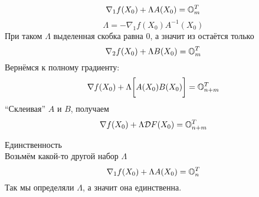 \begin{iproof}
	$$ \nabla_1f(X_0) + \Lambda A(X_0) = \On[m]^T $$
	$$ \Lambda = -\nabla_1f(X_0) A^{-1}(X_0) $$
	При таком $ \Lambda $ выделенная скобка равна 0, а значит из  остаётся только
	$$ \nabla_2f(X_0) + \Lambda B(X_0) = \On[m]^T $$
	Вернёмся к полному градиенту:
	$$ \nabla f(X_0) + \Lambda \bigg[ A(X_0) B(X_0) \bigg] = \On[n + m]^T $$
	``Склеивая'' $ A $ и $ B $, получаем
	$$ \nabla f(X_0) + \Lambda \mc{D}F(X_0) = \On[n + m]^T $$
	\item Единственность \\
	Возьмём какой-то другой набор $ \Lambda $
	$$ \nabla_1 f(X_0) + \Lambda A(X_0) = \On[n]^T $$
	Так мы определяли $ \Lambda $, а значит она единственна.
\end{iproof}
